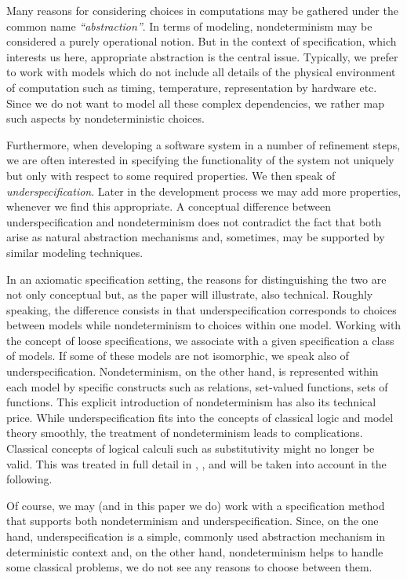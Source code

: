 Many reasons for considering choices in computations may be gathered under the
common name {\em ``abstraction''}. In terms of modeling, nondeterminism may be considered a purely operational notion. But in the context of specification,
which interests us here, appropriate abstraction is the central issue. Typically, we prefer to
work with models which do not include all details of the physical environment of computation such as timing, temperature, representation by hardware etc. Since
we do not want to model all these complex dependencies, we rather map such aspects by nondeterministic choices. 

Furthermore, when developing a software system in a number of refinement steps,
we are often interested in specifying the functionality of the system not uniquely
but only with respect to some required properties. We then speak of {\em underspecification}. Later in the development process we may add more properties, whenever we find this appropriate. A conceptual difference between underspecification and nondeterminism does not
contradict the fact that both arise as natural abstraction mechanisms and, sometimes, may be supported by similar modeling techniques. 

In an axiomatic specification setting, the reasons for distinguishing the two are not only conceptual but, as the paper will illustrate, also technical. Roughly speaking, the difference consists in that underspecification corresponds to choices between models while nondeterminism to choices within one model. Working with the concept of loose specifications, we associate with a given specification a class of models. If some of these models are not isomorphic, we speak also of underspecification. Nondeterminism, on the other hand, is represented within each model by specific constructs such as relations, set-valued functions, sets of functions.
This explicit introduction of nondeterminism has also its technical price. While underspecification fits into the concepts of classical logic and model theory smoothly, the treatment of nondeterminism leads to complications. Classical concepts of logical calculi such as substitutivity might no longer be valid.
This was treated in full detail in \cite{top}, \cite{adt}, and will be taken into account in the following.

Of course, we may (and in this paper we do) work with a specification method that supports both
nondeterminism and underspecification. Since, on the one hand, underspecification is a simple, commonly used abstraction mechanism in deterministic
context and, on the other hand, nondeterminism helps to handle some classical problems, we do not see any reasons to choose between them. 

